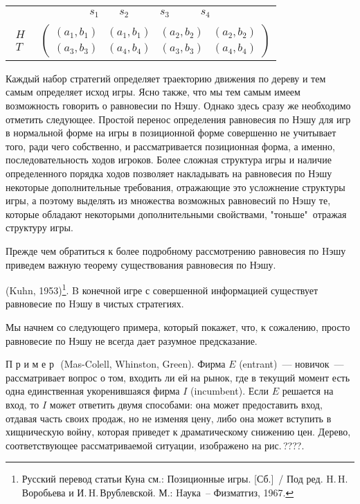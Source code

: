 \documentclass[12pt]{article}
\begin{document}
\begin{center}
\begin{tabular}{cc}
&$\begin{array}{cccc} \quad s_1\quad& s_2\quad&\quad s_3\qquad& s_4\qquad \end{array}$\\
$\begin{array}{c} H\\T \end{array}$& $\left( \begin{array}{cccc}
(a_1,b_1)&(a_1,b_1)&(a_2,b_2)&(a_2,b_2)\\
(a_3,b_3)&(a_4,b_4)&(a_3,b_3)&(a_4,b_4) \end{array} \right)$\\
\end{tabular}
\end{center}

Каждый набор стратегий определяет траекторию движения по дереву и
тем самым определяет исход игры. Ясно также, что мы тем самым имеем
возможность говорить о равновесии по Нэшу. Однако здесь сразу же
необходимо отметить следующее. Простой перенос определения равновесия
по Нэшу для игр в нормальной форме на игры в позиционной форме
совершенно не учитывает того, ради чего собственно, и рассматривается
позиционная форма, а именно, последовательность ходов игроков.
Более сложная структура игры и наличие определенного порядка ходов
позволяет накладывать на равновесия по Нэшу некоторые дополнительные
требования, отражающие это усложнение структуры игры, а поэтому
выделять из множества возможных равновесий по Нэшу те, которые
обладают некоторыми дополнительными свойствами, "тоньше"\, отражая
структуру игры.

Прежде чем обратиться к более подробному рассмотрению равновесия по
Hэшу приведем важную теорему существования равновесия по Нэшу.

\begin{theorem}
{(\rm Kuhn, 1953)}\footnote{ Русский перевод статьи Куна см.:
Позиционные игры. [Сб.]~/ Под ред. H.\,H.\,Воробьева и
И.\,H.\,Врублевской.  М.: Hаука~-- Физматгиз, 1967.}.  B конечной
игре с совершенной информацией существует равновесие по Hэшу в
чистых стратегиях.
\end{theorem}

Мы начнем со следующего примера, который покажет, что, к сожалению,
просто равновесие по Нэшу не всегда дает разумное предсказание.
\smallskip

П р и м е р\,\, (Mas-Colell, Whinston, Green). Фирма $E$
(entrant)~--- новичок~--- рассматривает вопрос о том, входить ли
ей на рынок, где в текущий момент есть одна единственная
укоренившаяся фирма $I$ (incumbent). Если $E$ решается на вход, то
$I$ может ответить двумя способами: она может предоставить вход,
отдавая часть своих продаж, но не изменяя цену, либо она может
вступить в хищническую войну, которая приведет к драматическому
снижению цен. Дерево, соответствующее рассматриваемой ситуации,
изображено на рис.\,????.
\end{document}
